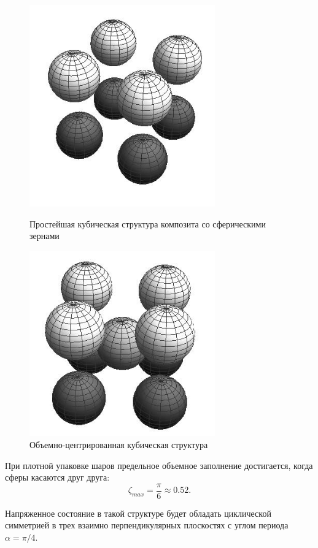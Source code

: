 \begin{figure}[h!]
\centering\footnotesize
\parbox[b]{7.5cm}{\centering\includegraphics[width=8cm]{cav-8.jpg}
\caption{Простейшая кубическая структура композита со сферическими зернами
\label{f:8:1}}}\hfil\hfil
\parbox[b]{7.5cm}{\centering\includegraphics[width=8cm]{cav-9.jpg}
\caption{Объемно-центрированная кубическая структура
\label{f:8:2}}}
\end{figure}


При плотной упаковке шаров предельное объемное заполнение достигается, когда сферы касаются друг друга:
$$
\zeta_{max}=\frac{\pi}{6}\approx 0.52.
$$

Напряженное состояние в такой структуре будет обладать циклической симметрией в трех взаимно перпендикулярных плоскостях с углом периода $\alpha=\pi/4$.

